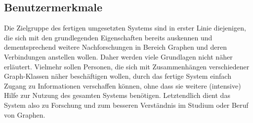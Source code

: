 \documentclass[11pt,a4paper]{article}
\begin{document}
    \subsection{Benutzermerkmale} %
	Die Zielgruppe des fertigen umgesetzten Systems sind in erster Linie diejenigen, die sich mit den grundlegenden Eigenschaften bereits auskennen und dementsprechend weitere Nachforschungen in Bereich Graphen und deren Verbindungen anstellen wollen. Daher werden viele Grundlagen nicht näher erläutert. Vielmehr sollen Personen, die sich mit Zusammenhängen verschiedener Graph-Klassen näher beschäftigen wollen, durch das fertige System einfach Zugang zu Informationen verschaffen können, ohne dass sie weitere (intensive) Hilfe zur Nutzung des gesamten Systems benötigen.
	Letztendlich dient das System also zu Forschung und zum besseren Verständnis im Studium oder Beruf von Graphen.
\end{document}
